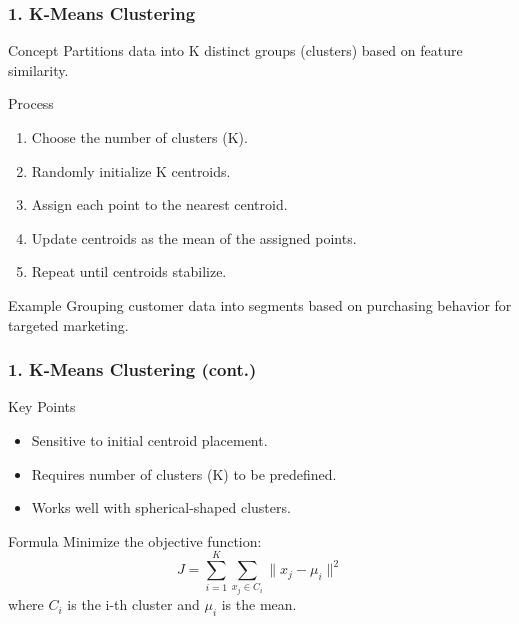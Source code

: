 \documentclass[aspectratio=169]{beamer}
\begin{document}
\begin{frame}[fragile]
    \frametitle{1. K-Means Clustering}
    \begin{block}{Concept}
        Partitions data into K distinct groups (clusters) based on feature similarity.
    \end{block}
    \begin{block}{Process}
        \begin{enumerate}
            \item Choose the number of clusters (K).
            \item Randomly initialize K centroids.
            \item Assign each point to the nearest centroid.
            \item Update centroids as the mean of the assigned points.
            \item Repeat until centroids stabilize.
        \end{enumerate}
    \end{block}
    \begin{block}{Example}
        Grouping customer data into segments based on purchasing behavior for targeted marketing.
    \end{block}
\end{frame}

\begin{frame}[fragile]
    \frametitle{1. K-Means Clustering (cont.)}
    \begin{block}{Key Points}
        \begin{itemize}
            \item Sensitive to initial centroid placement.
            \item Requires number of clusters (K) to be predefined.
            \item Works well with spherical-shaped clusters.
        \end{itemize}
    \end{block}
    \begin{block}{Formula}
        Minimize the objective function:
        \begin{equation}
        J = \sum_{i=1}^{K} \sum_{x_j \in C_i} \| x_j - \mu_i \|^2
        \end{equation}
        where \( C_i \) is the i-th cluster and \( \mu_i \) is the mean.
    \end{block}
\end{frame}
\end{document}
